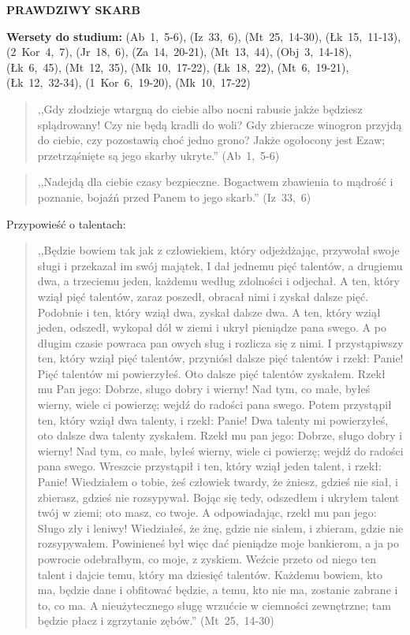 \documentclass[10pt,a4paper,oneside]{article}
\begin{document}
\centerline{\textbf{\MakeUppercase{Prawdziwy skarb}}}
\begin{center}
\textbf{Wersety do studium:} \mbox{(Ab 1, 5-6)}, \mbox{(Iz 33, 6)}, \mbox{(Mt 25, 14-30)}, \mbox{(Łk 15, 11-13)}, \mbox{(2 Kor 4, 7)}, \mbox{(Jr 18, 6)}, \mbox{(Za 14, 20-21)}, \mbox{(Mt 13, 44)}, \mbox{(Obj 3, 14-18)}, \mbox{(Łk 6, 45)}, \mbox{(Mt 12, 35)}, \mbox{(Mk 10, 17-22)}, \mbox{(Łk 18, 22)}, \mbox{(Mt 6, 19-21)}, \mbox{(Łk 12, 32-34)}, \mbox{(1 Kor 6, 19-20)}, \mbox{(Mk 10, 17-22)}
\end{center}
\begin{quote}
,,Gdy złodzieje wtargną do ciebie albo nocni rabusie jakże będziesz splądrowany! Czy nie będą kradli do woli? Gdy zbieracze winogron przyjdą do ciebie, czy pozostawią choć jedno grono? Jakże ogołocony jest Ezaw; przetrząśnięte są jego skarby ukryte.'' \mbox{(Ab 1, 5-6)}
\end{quote}
\begin{quote}
,,Nadejdą dla ciebie czasy bezpieczne. Bogactwem zbawienia to mądrość i poznanie, bojaźń przed Panem to jego skarb.'' \mbox{(Iz 33, 6)}
\end{quote}

Przypowieść o talentach:
\begin{quote}
,,Będzie bowiem tak jak z człowiekiem, który odjeżdżając, przywołał swoje sługi i przekazał im swój majątek, I dał jednemu pięć talentów, a drugiemu dwa, a trzeciemu jeden, każdemu według zdolności i odjechał. A ten, który wziął pięć talentów, zaraz poszedł, obracał nimi i zyskał dalsze pięć. Podobnie i ten, który wziął dwa, zyskał dalsze dwa. A ten, który wziął jeden, odszedł, wykopał dół w ziemi i ukrył pieniądze pana swego. A po długim czasie powraca pan owych sług i rozlicza się z nimi. I przystąpiwszy ten, który wziął pięć talentów, przyniósł dalsze pięć talentów i rzekł: Panie! Pięć talentów mi powierzyłeś. Oto dalsze pięć talentów zyskałem. Rzekł mu Pan jego: Dobrze, sługo dobry i wierny! Nad tym, co małe, byłeś wierny, wiele ci powierzę; wejdź do radości pana swego. Potem przystąpił ten, który wziął dwa talenty, i rzekł: Panie! Dwa talenty mi powierzyłeś, oto dalsze dwa talenty zyskałem. Rzekł mu pan jego: Dobrze, sługo dobry i wierny! Nad tym, co małe, byłeś wierny, wiele ci powierzę; wejdź do radości pana swego. Wreszcie przystąpił i ten, który wziął jeden talent, i rzekł: Panie! Wiedziałem o tobie, żeś człowiek twardy, że żniesz, gdzieś nie siał, i zbierasz, gdzieś nie rozsypywał. Bojąc się tedy, odszedłem i ukryłem talent twój w ziemi; oto masz, co twoje. A odpowiadając, rzekł mu pan jego: Sługo zły i leniwy! Wiedziałeś, że żnę, gdzie nie siałem, i zbieram, gdzie nie rozsypywałem. Powinieneś był więc dać pieniądze moje bankierom, a ja po powrocie odebrałbym, co moje, z zyskiem. Weźcie przeto od niego ten talent i dajcie temu, który ma dziesięć talentów. Każdemu bowiem, kto ma, będzie dane i obfitować będzie, a temu, kto nie ma, zostanie zabrane i to, co ma. A nieużytecznego sługę wrzućcie w ciemności zewnętrzne; tam będzie płacz i zgrzytanie zębów.'' \mbox{(Mt 25, 14-30)}
\end{quote}
\end{document}
